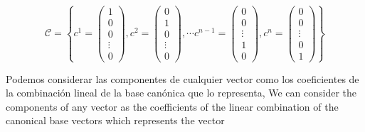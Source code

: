 \begin{equation*}
\mathcal{C}=\left\lbrace c^1=\begin{pmatrix}
1\\
0\\
0\\
\vdots \\
0
\end{pmatrix}, c^2=\begin{pmatrix}
0\\
1\\
0\\
\vdots \\
0
\end{pmatrix},
\cdots
c^{n-1}=\begin{pmatrix}
0\\
0\\
\vdots \\
1\\
0
\end{pmatrix},
c^n=\begin{pmatrix}
0\\
0\\
\vdots \\
0\\
1
\end{pmatrix} \right\rbrace
\end{equation*} 
\begin{paracol}{2}
Podemos considerar las componentes de cualquier vector como los coeficientes de la combinación lineal de la base canónica que lo representa,
\switchcolumn
We can consider the components of any vector as the coefficients of the linear combination of the canonical base vectors which represents the vector
\end{paracol}
